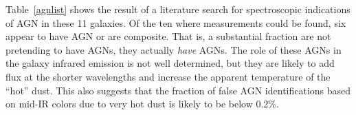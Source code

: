 \documentclass[twocolumn]{aastex63}
\begin{document}
{Table~\ref{agnlist} shows the result of a literature search for spectroscopic
indications of AGN in these 11 galaxies. Of the ten where measurements could be
found, six appear to have AGN or are composite. That is, a substantial fraction
are not pretending to have AGNs, they actually {\it have} AGNs. The role of these AGNs
in the galaxy infrared emission is not well determined, but they are likely to add flux
at the shorter wavelengths and increase the apparent temperature of the ``hot''
dust. This also suggests that the fraction of false AGN identifications based on mid-IR colors due to
very hot dust is likely to be below 0.2\%. %

}
\end{document}
